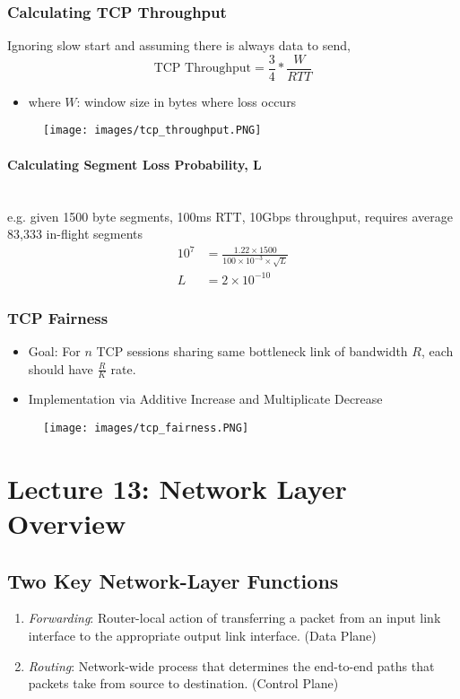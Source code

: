 \documentclass[a4paper]{article}
\begin{document}
\subsubsection{Calculating TCP Throughput}
Ignoring slow start and assuming there is always data to send,
$$\text{TCP Throughput} = \frac{3}{4}*\frac{W}{RTT}$$
\begin{itemize}
    \item where $W$: window size in bytes where loss occurs
\end{itemize}
\begin{figure}[H]
    \centering
    \texttt{[image: images/tcp\_throughput.PNG]}
\end{figure}

\paragraph{Calculating Segment Loss Probability, L}\mbox{}\\
e.g. given 1500 byte segments, 100ms RTT, 10Gbps throughput, requires average 83,333 in-flight segments
\begin{align*}
    10^7 &=  \frac{1.22\times1500}{100\times10^{-3}\times\sqrt{L}}\\
    L &= 2\times 10^{-10}
\end{align*}

\newpage
\subsubsection{TCP Fairness}
\begin{itemize}
    \item Goal: For $n$ TCP sessions sharing same bottleneck link of bandwidth $R$, each should have $\displaystyle\frac{R}{K}$ rate.
    \item Implementation via Additive Increase and Multiplicate Decrease
\end{itemize}
\begin{figure}[H]
    \centering
    \texttt{[image: images/tcp\_fairness.PNG]}
\end{figure}

\newpage
\section{Lecture 13: Network Layer Overview}
\subsection{Two Key Network-Layer Functions}
\begin{enumerate}
    \item \textit{Forwarding}: Router-local action of transferring a packet from an input link interface to the appropriate output link interface. (Data Plane)
    \item \textit{Routing}: Network-wide process that determines the end-to-end paths that packets take from source to destination. (Control Plane)
\end{enumerate}
\end{document}

